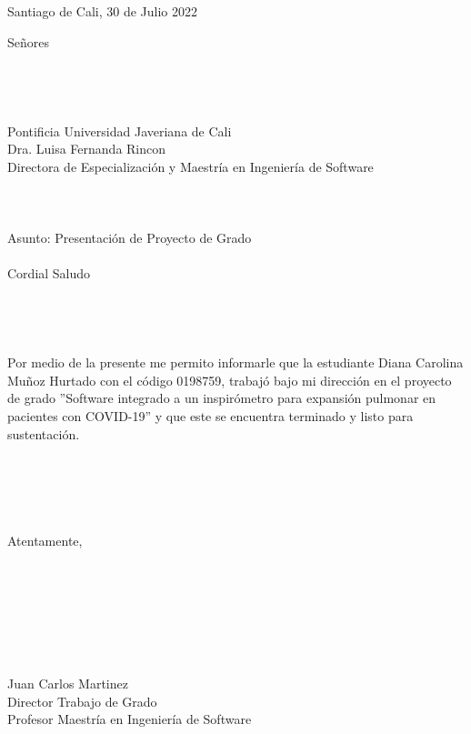 \begin{flushright}
Santiago de Cali, 30 de Julio 2022
\end{flushright}
Señores\\
\\
\\
\\
\\
Pontificia Universidad Javeriana de Cali\\
Dra. Luisa Fernanda Rincon\\
Directora de Especialización y Maestría en Ingeniería de Software \\\\
\\
\\
Asunto: Presentación de Proyecto de Grado\\
\\
Cordial Saludo\\\\
\\
\\
\\
Por medio de la presente me permito informarle que la estudiante Diana Carolina Muñoz Hurtado con el código 0198759, trabajó bajo mi dirección en el proyecto de grado ''Software integrado a un inspirómetro para expansión pulmonar
en pacientes con COVID-19'' y que este se encuentra terminado y listo para sustentación.\\
\\
\\
\\
\\
\\
Atentamente,\\\\\\
\\
\\
\\
\\
\\
Juan Carlos Martinez\\
Director Trabajo de Grado\\
Profesor Maestría en Ingeniería de Software
\newpage
